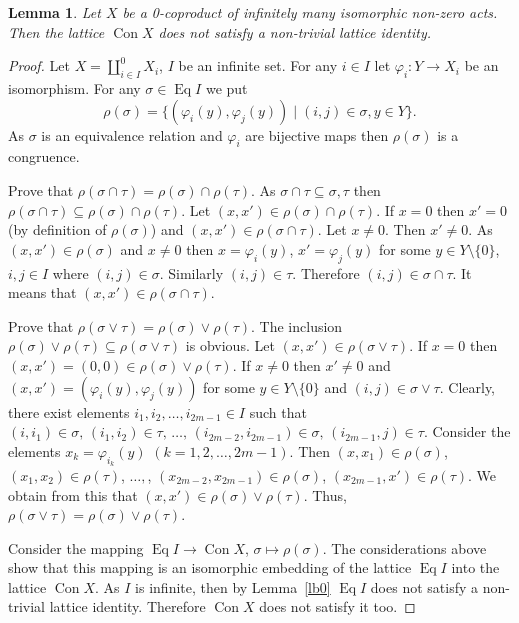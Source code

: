 \documentclass{birkau}
\numberwithin{equation}{section}
\theoremstyle{plain}
\newtheorem{lemma}[theorem]{Lemma}
\theoremstyle{definition}
\DeclareMathOperator{\Con}{Con}
\DeclareMathOperator{\Eq}{Eq}
\begin{document}
	\begin{lemma} \label{lemma:456}
	    Let $X$ be a 0-coproduct of infinitely many isomorphic non-zero acts. Then the lattice $\Con X$ does not satisfy a non-trivial lattice identity.
	\end{lemma}
	\begin{proof}
	    Let $X=\coprod_{i\in I}^0X_i$, $I$ be an infinite set. For any $i \in I$ let $\varphi_i: Y\to X_i$ be an isomorphism. For any $\sigma \in \Eq I$ we put $$ \rho(\sigma)= \{ (\varphi_i(y), \varphi_j(y)) \mid (i,j)\in \sigma, y\in Y \}. $$ As $\sigma$ is an equivalence relation and $\varphi_i$ are bijective maps then $\rho(\sigma)$ is a congruence.

        Prove that $\rho(\sigma \cap \tau) = \rho(\sigma) \cap \rho(\tau)$. As $\sigma \cap \tau \subseteq \sigma, \tau$ then $\rho(\sigma \cap \tau) \subseteq \rho(\sigma) \cap \rho(\tau)$. Let $ (x, x') \in \rho(\sigma) \cap \rho(\tau)$. If $x=0$ then $x'=0$ (by definition of $\rho(\sigma)$) and $ (x, x') \in \rho(\sigma \cap \tau)$. Let $x \ne 0$. Then $x' \ne 0$. As $ (x, x') \in \rho(\sigma)$ and $x \ne 0$ then $x=\varphi_i(y)$, $x'=\varphi_j(y)$ for some $y\in Y \setminus \{0\}$, $i,j \in I$ where $(i, j) \in \sigma$. Similarly $(i, j) \in \tau$. Therefore $(i, j)\in \sigma \cap \tau$. It means that $(x, x') \in \rho(\sigma \cap \tau)$.

        Prove that $\rho(\sigma \vee \tau) = \rho(\sigma) \vee \rho(\tau)$.  The inclusion  $\rho(\sigma) \vee \rho(\tau) \subseteq \rho(\sigma \vee \tau)$ is obvious. Let $(x, x') \in \rho(\sigma \vee \tau)$. If $x=0$ then $(x, x') = (0,0) \in \rho(\sigma) \vee \rho(\tau)$. If $x \ne 0$ then $x' \ne 0$ and $(x, x') =(\varphi_i(y), \varphi_j(y))$ for some $y\in Y \setminus \{ 0\}$ and $(i, j) \in \sigma \vee \tau$. Clearly, there exist elements $i_1, i_2, \ldots, i_{2m-1} \in I$ such that $(i, i_1) \in \sigma, \,(i_1, i_2) \in \tau, \, \ldots, \, (i_{2m-2}, i_{2m-1}) \in \sigma, \, (i_{2m-1}, j) \in \tau$. Consider the elements $x_k=\varphi_{i_k}(y)$ $(k=1,2, \ldots, 2m-1)$. Then $(x, x_1) \in \rho(\sigma)$, $(x_1, x_2) \in \rho(\tau)$, $\ldots,$, $(x_{2m-2}, x_{2m-1}) \in \rho(\sigma)$, $(x_{2m-1}, x') \in \rho(\tau)$. We obtain from this that $(x, x') \in \rho(\sigma) \vee \rho(\tau)$. Thus, $\rho(\sigma \vee \tau) = \rho(\sigma) \vee \rho(\tau)$.

        Consider the mapping $\Eq I \to \Con X$, $\sigma \mapsto \rho(\sigma)$. The considerations above show that this mapping is an isomorphic embedding of the lattice $\Eq I$ into the lattice $\Con X$. As $I$ is infinite, then by Lemma~\ref{lb0} $\Eq I$ does not satisfy a non-trivial lattice identity. Therefore $\Con X$ does not satisfy it too.
	\end{proof}
	
\end{document}
